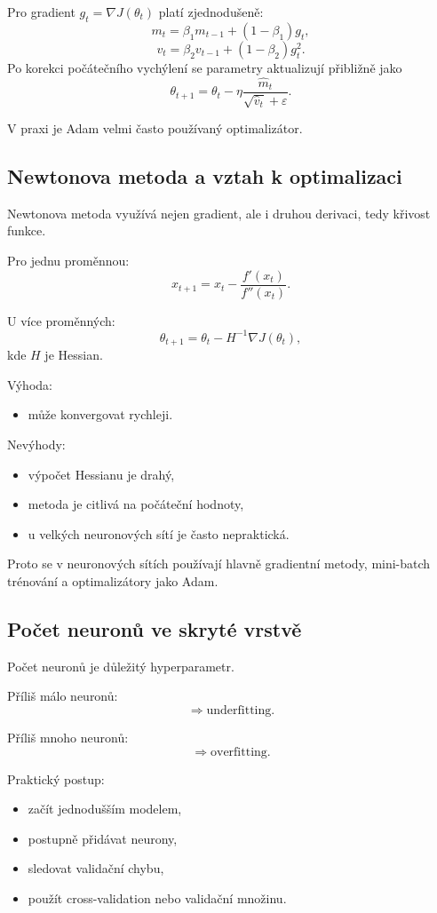 Pro gradient $g_t=\nabla J(\theta_t)$ platí zjednodušeně:
\[
m_t=\beta_1m_{t-1}+(1-\beta_1)g_t,
\]
\[
v_t=\beta_2v_{t-1}+(1-\beta_2)g_t^2.
\]
Po korekci počátečního vychýlení se parametry aktualizují přibližně jako
\[
\theta_{t+1}
=
\theta_t
-
\eta
\frac{\hat{m}_t}{\sqrt{\hat{v}_t}+\varepsilon}.
\]

V praxi je Adam velmi často používaný optimalizátor.

\subsection{Newtonova metoda a vztah k optimalizaci}

Newtonova metoda využívá nejen gradient, ale i druhou derivaci, tedy křivost funkce.

Pro jednu proměnnou:
\[
x_{t+1}
=
x_t
-
\frac{f'(x_t)}{f''(x_t)}.
\]

U více proměnných:
\[
\theta_{t+1}
=
\theta_t
-
H^{-1}
\nabla J(\theta_t),
\]
kde $H$ je Hessian.

Výhoda:
\begin{itemize}
    \item může konvergovat rychleji.
\end{itemize}

Nevýhody:
\begin{itemize}
    \item výpočet Hessianu je drahý,
    \item metoda je citlivá na počáteční hodnoty,
    \item u velkých neuronových sítí je často nepraktická.
\end{itemize}

Proto se v neuronových sítích používají hlavně gradientní metody, mini-batch trénování a optimalizátory jako
Adam.

\subsection{Počet neuronů ve skryté vrstvě}

Počet neuronů je důležitý hyperparametr.

Příliš málo neuronů:
\[
\Rightarrow
\text{underfitting}.
\]

Příliš mnoho neuronů:
\[
\Rightarrow
\text{overfitting}.
\]

Praktický postup:
\begin{itemize}
    \item začít jednodušším modelem,
    \item postupně přidávat neurony,
    \item sledovat validační chybu,
    \item použít cross-validation nebo validační množinu.
\end{itemize}

